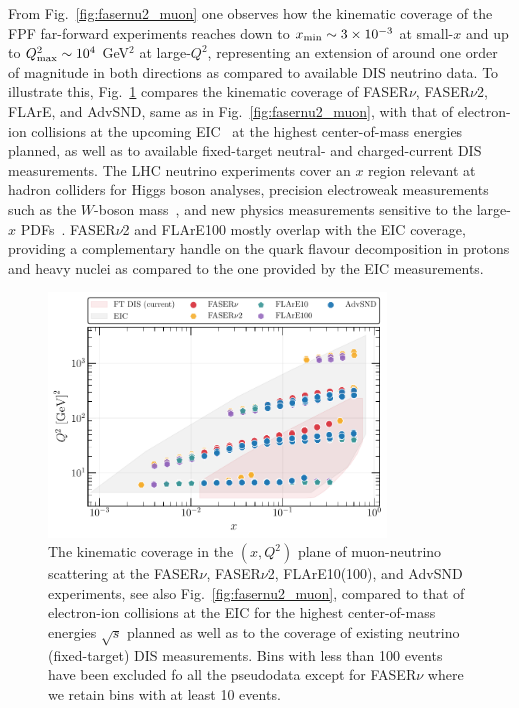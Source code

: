From Fig.~\ref{fig:fasernu2_muon} one observes
how the kinematic coverage of the FPF far-forward experiments reaches down to
$x_{\rm min}\sim 3\times 10^{-3}$ at small-$x$ and up to $Q^2_{\rm max}\sim 10^4$ GeV$^2$
at large-$Q^2$, representing an extension
of around one order of magnitude in both directions as compared to available
DIS neutrino data.
%
To illustrate this,
Fig.~\ref{fig:Kin_nNNPDF30_EIC_FPF} compares
the kinematic coverage of FASER$\nu$, FASER$\nu$2, FLArE, and AdvSND, same as in
Fig.~\ref{fig:fasernu2_muon}, with that of electron-ion collisions
at the upcoming EIC~\cite{Khalek:2021ulf,AbdulKhalek:2021gbh} at the highest
center-of-mass energies planned, as well as to available fixed-target
neutral- and charged-current DIS measurements.
%
The LHC neutrino experiments cover an $x$ region relevant
at hadron colliders for Higgs boson analyses,
precision electroweak measurements  such as the $W$-boson
mass~\cite{Amoroso:2023pey}, and new physics measurements sensitive
to the large-$x$ PDFs~\cite{Ball:2022qtp}.
%
FASER$\nu$2 and FLArE100 mostly overlap with the EIC coverage, providing a complementary handle
on the quark flavour decomposition in protons and heavy nuclei as compared
to the one provided by the EIC measurements.

\begin{figure}[t]
    \centering
    \includegraphics[width = 0.80\textwidth]{plots/KIN_DIS_FPF.pdf}
    \caption{
      The kinematic coverage in the $(x,Q^2)$ plane of muon-neutrino scattering
      at the FASER$\nu$, FASER$\nu$2, FLArE10(100), and AdvSND experiments, see also Fig.~\ref{fig:fasernu2_muon},
      compared to that of electron-ion collisions at the EIC for the highest center-of-mass 
      energies $\sqrt{s}$ planned as well as to the coverage of existing neutrino
      (fixed-target) DIS measurements.
      Bins with less than 100 events have been excluded fo all the pseudodata except for FASER$\nu$ where we retain
      bins with at least 10 events.
    }
    \label{fig:Kin_nNNPDF30_EIC_FPF}
\end{figure}

